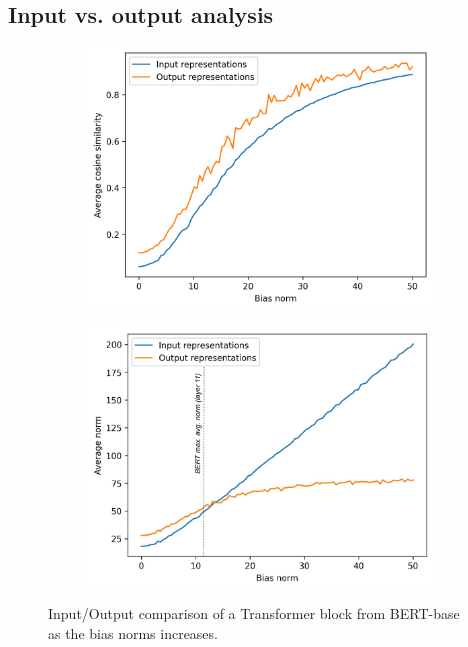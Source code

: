 \subsection{Input vs. output analysis}
\begin{figure}[ht]
    \centering
    \begin{subfigure}[b]{0.45\columnwidth}
         \includegraphics[width=\linewidth]{sources/part_1/anisotropy/imgs/scratch_bert_base_input_vs_output.png}
         \label{fig:cos_scratch_transformer}
    \end{subfigure}
    \hfill
    \begin{subfigure}[b]{0.45\columnwidth}
         \includegraphics[width=\linewidth]{sources/part_1/anisotropy/imgs/bert_base_norm_v_output.pdf}
         \label{fig:norm_scratch_transformer}
    \end{subfigure}
    \caption{Input/Output comparison of a Transformer block from BERT-base as the bias norms increases.}
    \label{fig:bias_vs_cosine_norm}
\end{figure}

